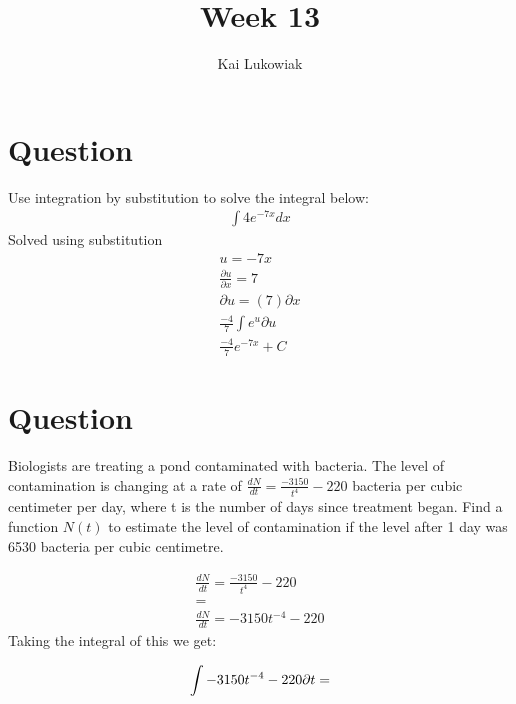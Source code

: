 \documentclass[12pt]{article}
\begin{document}

\title{Week 13}
\author{Kai Lukowiak}
\maketitle
\section{Question}
Use integration by substitution to solve the integral below:
\begin{align*}
\int 4e ^{-7x}dx
\end{align*}
Solved using substitution
\begin{align}
  u=-7x
  \\
  \frac{\partial u}{\partial x} = 7
  \\
  \partial u = (7) \partial x
  \\
  \frac{-4}{7} \int e^u \partial u
  \\
  \frac {-4} {7} e^{-7x} + C
\end{align}

\section{Question}

Biologists are treating a pond contaminated with bacteria. The level of
contamination is changing at a rate of
$\frac {dN} {dt} = \frac {- 3150}{t^4} - 220$ bacteria per cubic centimeter per
day, where t is the number of days since treatment began. Find a function
$N( t )$ to estimate the level of contamination if the level after 1 day was
6530 bacteria per cubic centimetre.

\begin{align}
  \frac {dN} {dt} = \frac {- 3150}{t^4} - 220
  \\
  =
  \\
  \frac {dN} {dt} = -3150 t^{-4}-220
\end{align}
Taking the integral of this we get:

\begin{equation}
  \setcounter{equation}{0}
  \int -3150 t^{-4}-220 \partial t
  \\
  =
\end{equation}
\end{document}

